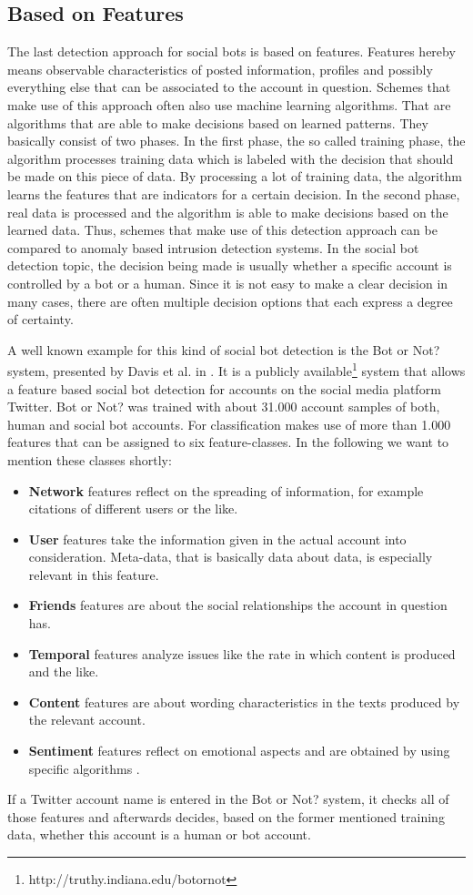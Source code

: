 \subsection{Based on Features}
The last detection approach for social bots is based on features. Features hereby means observable characteristics of posted information, profiles and possibly everything else that can be associated to the account in question. Schemes that make use of this approach often also use machine learning algorithms. That are algorithms that are able to make decisions based on learned patterns. They basically consist of two phases. In the first phase, the so called training phase, the algorithm processes training data which is labeled with the decision that should be made on this piece of data. By processing a lot of training data, the algorithm learns the features that are indicators for a certain decision. In the second phase, real data is processed and the algorithm is able to make decisions based on the learned data. Thus, schemes that make use of this detection approach can be compared to anomaly based intrusion detection systems. In the social bot detection topic, the decision being made is usually whether a specific account is controlled by a bot or a human. Since it is not easy to make a clear decision in many cases, there are often multiple decision options that each express a degree of certainty.

A well known example for this kind of social bot detection is the Bot or Not? system, presented by Davis et al. in \cite{botornot}. It is a publicly available\footnote{http://truthy.indiana.edu/botornot} system that allows a feature based social bot detection for accounts on the social media platform Twitter. Bot or Not? was trained with about 31.000 account samples of both, human and social bot accounts. For classification makes use of more than 1.000 features that can be assigned to six feature-classes. In the following we want to mention these classes shortly:
\begin{itemize}
	\item \textbf{Network} features reflect on the spreading of information, for example citations of different users or the like.
	\item \textbf{User} features take the information given in the actual account into consideration. Meta-data, that is basically data about data, is especially relevant in this feature. 
	\item \textbf{Friends} features are about the social relationships the account in question has.
	\item \textbf{Temporal} features analyze issues like the rate in which content is produced and the like.
	\item \textbf{Content} features are about wording characteristics in the texts produced by the relevant account.
	\item \textbf{Sentiment} features reflect on emotional aspects and are obtained by using specific algorithms \cite{botornot}.
\end{itemize}  
If a Twitter account name is entered in the Bot or Not? system, it checks all of those features and afterwards decides, based on the former mentioned training data, whether this account is a human or bot account.

